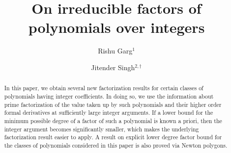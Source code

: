 \documentclass[12pt]{amsart}%
\begin{document}
\newtheorem{theorem}{Theorem}
\newtheorem{corollary}[theorem]{Corollary}
\newtheorem{lemma}[theorem]{Lemma}
\theoremstyle{definition}
\newtheorem{example}{\bf Example}
\theoremstyle{theorem}
\newtheorem{conjecture}[theorem]{Conjecture}
\newtheorem{thmx}{\bf Theorem}
\renewcommand{\thethmx}{\text{\Alph{thmx}}}%
\newtheorem{lemmax}{\bf Lemma}
\renewcommand{\thelemmax}{\text{\Alph{lemmax}}}%
\hoffset=-0cm
\theoremstyle{definition}
\newtheorem*{definition}{Definition}
\theoremstyle{remark}
\newtheorem*{remark}{\bf Remark}
\theoremstyle{remark}
\newtheorem*{remarks}{\bf Remarks}
\parindent=0cm
\title{\bf On irreducible factors of polynomials over integers}
\author{Rishu Garg$^{1}$ {\large {}}}
\author{Jitender Singh$^{2,\dagger}$ {\large {}}}
\address[1,2]{Department of Mathematics,
Guru Nanak Dev University, Amritsar-143005, India\newline %
{\tt jitender.math@gndu.ac.in}, {\tt rishugarg128@gmail.com}}
\markright{}
\date{}
\maketitle
\newcommand{\K}{\mathbb{K}}
\begin{abstract}
In this paper, we obtain several new factorization results for certain classes of polynomials having integer coefficients. In doing so, we use the information about prime factorization of the value taken up by such polynomials and their higher order formal derivatives at sufficiently large integer arguments. If a lower bound for the minimum possible degree of a factor of such a  polynomial is known a priori, then the integer argument becomes significantly smaller, which makes the underlying factorization result easier to apply. A result on explicit lower degree factor bound for the classes of polynomials considered in this paper is also proved via Newton polygons.
\end{abstract}
\end{document}
